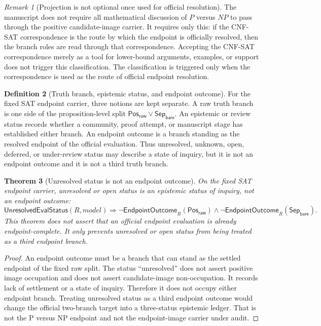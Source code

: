 \documentclass[11pt]{article}
\newtheorem{theorem}{Theorem}[section]
\theoremstyle{definition}
\newtheorem{definition}[theorem]{Definition}
\theoremstyle{remark}
\newtheorem{remark}[theorem]{Remark}
\newcommand{\PosRaw}{\mathsf{Pos}_{\mathsf{raw}}}
\newcommand{\SepBare}{\mathsf{Sep}_{\mathsf{bare}}}
\newcommand{\UnresolvedEvalStatus}{\mathsf{UnresolvedEvalStatus}}
\newcommand{\EndpointOutcome}{\mathsf{EndpointOutcome}}
\begin{document}
\begin{remark}[Projection is not optional once used for official resolution]\label{rem:projection-not-optional-once-used}
The manuscript does not require all mathematical discussion of \(P\) versus \(NP\) to pass through the positive candidate-image carrier. It requires only this: if the CNF-SAT correspondence is the route by which the endpoint is officially resolved, then the branch roles are read through that correspondence. Accepting the CNF-SAT correspondence merely as a tool for lower-bound arguments, examples, or support does not trigger this classification. The classification is triggered only when the correspondence is used as the route of official endpoint resolution.
\end{remark}

\begin{definition}[Truth branch, epistemic status, and endpoint outcome]
\label{def:truth-epistemic-endpoint-outcome}
For the fixed SAT endpoint carrier, three notions are kept separate.
A raw truth branch is one side of the proposition-level split \(\PosRaw\vee\SepBare\). An epistemic or review status records whether a community, proof attempt, or manuscript stage has established either branch. An endpoint outcome is a branch standing as the resolved endpoint of the official evaluation. Thus unresolved, unknown, open, deferred, or under-review status may describe a state of inquiry, but it is not an endpoint outcome and it is not a third truth branch.
\end{definition}

\begin{theorem}[Unresolved status is not an endpoint outcome]
\label{thm:unresolved-not-endpoint-outcome}
On the fixed SAT endpoint carrier, unresolved or open status is an epistemic status of inquiry, not an endpoint outcome:
\[
  \UnresolvedEvalStatus(R,model)\Rightarrow
  \neg\EndpointOutcome_R(\PosRaw)\wedge\neg\EndpointOutcome_R(\SepBare).
\]
This theorem does not assert that an official endpoint evaluation is already endpoint-complete. It only prevents unresolved or open status from being treated as a third endpoint branch.
\end{theorem}

\begin{proof}
An endpoint outcome must be a branch that can stand as the settled endpoint of the fixed raw split. The status ``unresolved'' does not assert positive image occupation and does not assert candidate-image non-occupation. It records lack of settlement or a state of inquiry. Therefore it does not occupy either endpoint branch. Treating unresolved status as a third endpoint outcome would change the official two-branch target into a three-status epistemic ledger. That is not the P versus NP endpoint and not the endpoint-image carrier under audit.
\end{proof}
\end{document}
